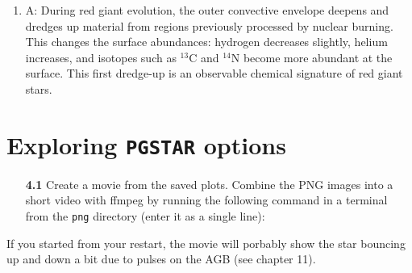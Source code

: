 \documentclass[11pt,a4paper]{article}
\begin{document}
\begin{enumerate}
\begin{enumerate}
\item {\color{blue} A: During red giant evolution, the outer convective envelope deepens and dredges up material from regions previously processed by nuclear burning. This changes the surface abundances: hydrogen decreases slightly, helium increases, and isotopes such as $^{13}$C and $^{14}$N become more abundant at the surface. This first dredge-up is an observable chemical signature of red giant stars.}


\end{enumerate}


\end{enumerate}

\section{Exploring \texttt{PGSTAR} options} 

\begin{enumerate}
  \item[\bf{4.1}] 
 Create a movie from the saved plots. Combine the PNG images into a short video with ffmpeg by running the following command in a terminal from the \verb'png' directory (enter it as a single line):
\end{enumerate}

{\color{blue} If you started from your restart, the movie will porbably show the star bouncing up and down a bit due to pulses on the AGB (see chapter 11). }







\end{document}
